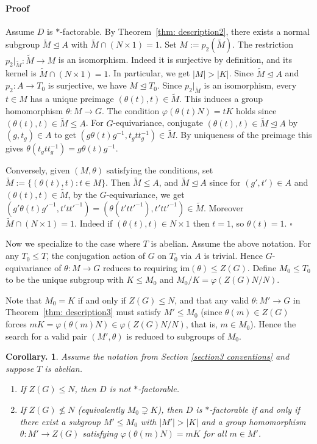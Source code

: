 \documentclass[12pt]{article}
\theoremstyle{change}
\newtheorem{coro}[theorem]{Corollary.}
\newenvironment{proof}{\paragraph{Proof}}{\hfill$\square$}
\renewcommand{\le}{\leqslant} %
\newcommand{\im}{\mathrm{im}}
\newcommand{\1}{{\bf 1}}
\begin{document}
\begin{proof} Assume \(D\) is $\ast$-factorable. By Theorem~\ref{thm: description2}, there exists a normal subgroup $\widetilde{M}\unlhd A$ with $\widetilde{M} \cap (N\times 1) = 1$. Set $M := p_2(\tilde M)$. The restriction $p_2|_{\tilde M}\colon \tilde M \to M$ is an isomorphism. Indeed it is surjective by definition, and its kernel is $\tilde M \cap (N\times 1) = 1$. In particular, we get $|M|>|K|$. Since
$\tilde M \trianglelefteq A$ and $p_{2}\colon A \to T_0$ is surjective, we have $M \trianglelefteq T_0$. Since $p_{2}|_{\tilde M}$ is an isomorphism, every $t \in M$ has a unique preimage $(\theta(t), t) \in \tilde M$. This induces a group homomorphism $\theta\colon M\to G$. The condition $\varphi(\theta(t)N) = tK$ holds since $(\theta(t),t) \in \tilde M \leq A$.  For $G$-equivariance,
conjugate $(\theta(t),t) \in \tilde M \trianglelefteq A$ by $(g,t_g) \in A$ to get $(g\theta(t)g^{-1}, t_g t t_g^{-1}) \in \tilde M$. By uniqueness of the preimage this gives $\theta(t_g t t_g^{-1}) = g\theta(t) g^{-1}$. 

\smallskip\noindent Conversely, given $(M, \theta)$ satisfying the conditions, set $\widetilde M := \{(\theta(t),t) : t \in M\}$. Then $\widetilde M \leq A$, and $\widetilde M \trianglelefteq A$ since for $(g',t') \in A$ and $(\theta(t),t) \in \widetilde M$, by the $G$-equivariance, we get $(g'\theta(t)g'^{-1}, t'tt'^{-1}) = (\theta(t'tt'^{-1}),t'tt'^{-1}) \in \widetilde M$.  Moreover $\widetilde M \cap (N\times 1) = 1$. Indeed if $(\theta(t),t) \in N\times 1$ then $t = 1$, so $\theta(t) = 1$.
\end{proof}

\smallskip 

Now we specialize to the case where $T$ is abelian. Assume the above notation. For any $T_0 \leq T$, the conjugation action of $G$ on $T_0$ via $A$ is trivial.  Hence $G$-equivariance of $\theta\colon M\to G$ reduces to requiring $\im(\theta) \leq Z(G)$.  Define $M_0 \leq T_0$ to be the unique subgroup with $K \leq M_0$ and $M_0/K = \varphi(Z(G)N/N)$.

Note that $M_0 = K$ if and only if $Z(G) \leq N$, and that any
valid $\theta\colon M'\to G$ in Theorem~\ref{thm: description3} must satisfy
$M' \leq M_0$ (since $\theta(m) \in Z(G)$ forces
$mK = \varphi(\theta(m)N) \in \varphi(Z(G)N/N)$, that is, $m \in M_0$).
Hence the search for a valid pair $(M', \theta)$ is reduced to subgroups of $M_0$.

\begin{coro}\label{cor:abelian_nonvanish}
Assume the notation from Section \ref{section3 conventions} and suppose $T$ is abelian. 
\begin{enumerate}[leftmargin=2em]
    \item If $Z(G) \leq N$, then $D$ is not $\ast$-factorable.
    \item If $Z(G)\not\le N$ (equivalently $M_0\supsetneq K$), then $D$ is $\ast$-factorable if and only if there exist a subgroup $M'\le M_0$ with $|M'|>|K|$ and a group homomorphism $\theta\colon M'\to Z(G)$ satisfying $\varphi(\theta(m)N)=mK$ for all $m\in M'$.
\end{enumerate}
\end{coro}
\end{document}
